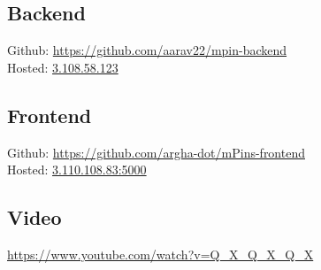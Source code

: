 \documentclass[]{article}   %
\begin{document}
\subsection*{Backend}
Github: \url{https://github.com/aarav22/mpin-backend} \\
Hosted: \url{3.108.58.123}
\subsection*{Frontend}
Github: \url{https://github.com/argha-dot/mPins-frontend} \\
Hosted: \url{3.110.108.83:5000}
\subsection*{Video}
\url{https://www.youtube.com/watch?v=Q_X_Q_X_Q_X}


\nocite{*}


\end{document}
